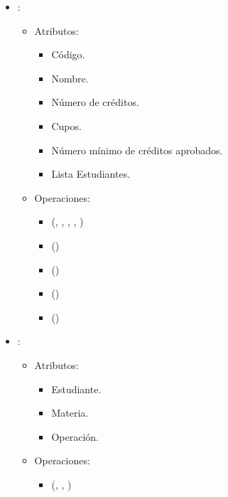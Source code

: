 \documentclass[11pt]{article}
\begin{document}
\begin{itemize}
      \item {}:
      \begin{itemize}
         \item Atributos:

         \begin{itemize}
            \item Código.
            \item Nombre.
            \item Número de créditos.
            \item Cupos.
            \item Número mínimo de créditos aprobados.
            \item Lista Estudiantes.
         \end{itemize}
      \end{itemize}

      \begin{itemize}
         \item Operaciones:
         
         \begin{itemize}
            \item {}(, , , , )
            \item {}()
            \item {}()
            \item {}()
            \item {}()
         \end{itemize}
      \end{itemize}


      \item {}:
      \begin{itemize}
         \item Atributos:

         \begin{itemize}
            \item Estudiante.
            \item Materia.
            \item Operación.
         \end{itemize}
      \end{itemize}

      \begin{itemize}
         \item Operaciones:
         
         \begin{itemize}
            \item {}(, , )
         \end{itemize}
      \end{itemize}
      
   \end{itemize}
\end{document}
